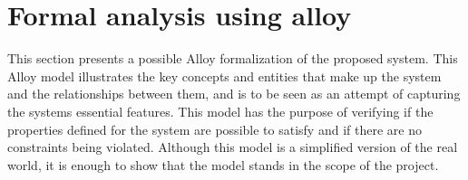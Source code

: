 \documentclass[../RASD.tex]{subfiles}
\begin{document}
    \chapter{Formal analysis using alloy }\label{ch:formal-analysis-using-alloy}
    This section presents a possible Alloy formalization of the proposed system.
    This Alloy model illustrates the key concepts and entities that make up the system and the relationships
    between them, and is to be seen as an attempt of capturing the systems essential features.
    This model has the purpose of verifying if the properties defined for the system are possible to satisfy and if there are no constraints being violated.
    Although this model is a simplified version of the real world, it is enough to show that the model stands in the scope of the project.
\end{document}
